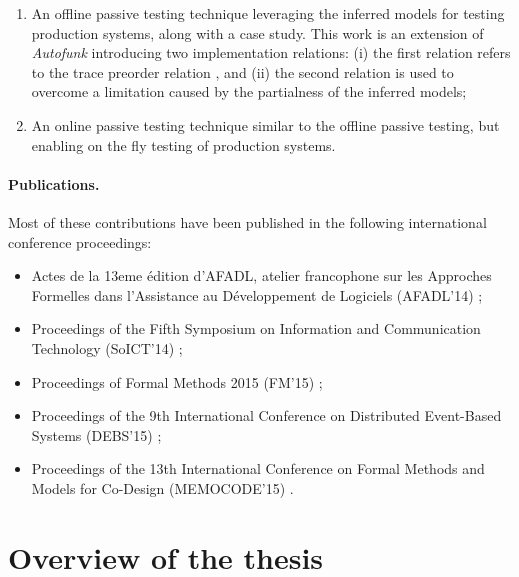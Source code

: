 \begin{enumerate}
    \item An offline passive testing technique leveraging the
        inferred models for testing production systems, along
        with a case study. This work is an extension of
        \textit{Autofunk} introducing two implementation
        relations: (i) the first relation refers to the trace
        preorder relation \cite{DNH84}, and (ii) the second
        relation is used to overcome a limitation caused by the
        partialness of the inferred models;

    \item An online passive testing technique similar to the
        offline passive testing, but enabling on the fly testing
        of production systems.
\end{enumerate}

\paragraph{Publications.} Most of these contributions have been
published in the following international conference proceedings:

\begin{itemize}
    \item Actes de la 13eme {\'e}dition d’AFADL, atelier
        francophone sur les Approches Formelles dans l’Assistance au
        D{\'e}veloppement de Logiciels (AFADL'14)
        \cite{durand2014inference};

    \item Proceedings of the Fifth Symposium on Information and
        Communication Technology (SoICT'14)
        \cite{DBLP:conf/soict/DurandS14};

    \item Proceedings of Formal Methods 2015 (FM'15)
        \cite{DBLP:conf/fm/DurandS15};

    \item Proceedings of the 9th International Conference on
        Distributed Event-Based Systems (DEBS'15)
        \cite{DBLP:conf/debs/SalvaD15};

    \item Proceedings of the 13th International Conference on Formal
        Methods and Models for Co-Design (MEMOCODE'15)
        \cite{7340480}.
\end{itemize}


\section{Overview of the thesis}
\label{sec:intro:overview}

